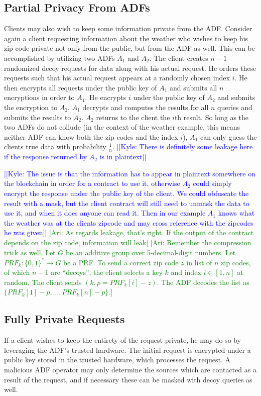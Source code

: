 \documentclass[letterpaper,twocolumn,10pt]{article}
\newcommand{\kyle}[1]{\textcolor{blue}{[[\textsf{Kyle:  #1}]]}}
\newcommand{\ari}[1]{\textcolor{green}{[\textsf{Ari:  #1}]}}
\begin{document}
\subsection{Partial Privacy From ADFs}
    Clients may also wish to keep some information private from the ADF.  Consider again a client requesting information about the weather who wishes to keep his zip code private not only from the public, but from the ADF as well.  This can be accomplished by utilizing two ADFs $A_1$ and $A_2$.  The client creates $n-1$ randomized decoy requests for data along with his actual request.  He orders these requests such that his actual request appears at a randomly chosen index $i$.  He then encrypts all requests under the public key of $A_1$ and submits all $n$ encryptions in order to $A_1$.  He encrypts $i$ under the public key of $A_2$ and submits the encryption to $A_2$.  $A_1$ decrypts and computes the results for all $n$ queries and submits the results to $A_2$.  $A_2$ returns to the client the $i$th result.  So long as the two ADFs do not collude (in the context of the weather example, this means neither ADF can know both the zip codes and the index $i$), $A_1$ can only guess the clients true data with probability $\frac{1}{n}$.  \kyle{There is definitely some leakage here if the response returned by $A_2$ is in plaintext} 
    
    
    \kyle{The issue is that the information has to appear in plaintext somewhere on the blockchain in order for a contract to use it, otherwise $A_2$ could simply encrypt the response under the public key of the client.  We could obfuscate the result with a mask, but the client contract will still need to unmask the data to use it, and when it does anyone can read it.  Then in our example $A_1$ knows what the weather was at the clients zipcode and may cross reference with the zipcodes he was given}
    \ari{As regards leakage, that's right. If the output of the contract depends on the zip code, information will leak}
    \ari{Remember the compression trick as well. Let $G$ be an additive group over 5-decimal-digit numbers. Let $PRF_k: \{0,1\}^{*} \rightarrow G$ be a PRF. To send a correct zip code $z$ in list of $n$ zip codes, of which $n-1$ are ``decoys'', the client selects a key $k$ and index $i \in [1,n]$ at random. The client sends $(k,p = PRF_k[i] - z)$. The ADF decodes the list as $\{PRF_k[1] - p, \ldots, PRF_k[n]  - p\}$.}

\subsection{Fully Private Requests}
    If a client wishes to keep the entirety of the request private, he may do so by leveraging the ADF's trusted hardware.  The initial request is encrypted under a public key stored in the trusted hardware, which processes the request.  A malicious ADF operator may only determine the sources which are contacted as a result of the request, and if necessary these can be masked with decoy queries as well.
\end{document}

